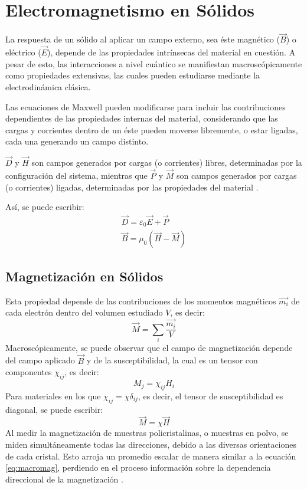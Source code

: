\documentclass[../main.tex]{subfiles}
\begin{document}
\section{Electromagnetismo en Sólidos}
La respuesta de un sólido al aplicar un campo externo, sea éste magnético ($\vec{B}$) o eléctrico ($\vec{E}$), depende de las propiedades intrínsecas del material en cuestión. A pesar de esto, las interacciones a nivel cuántico se manifiestan macroscópicamente como propiedades extensivas, las cuales pueden estudiarse mediante la electrodinámica clásica.

Las ecuaciones de Maxwell pueden modificarse para incluir las contribuciones dependientes de las propiedades internas del material, considerando que las cargas y corrientes dentro de un éste pueden moverse libremente, o estar ligadas, cada una generando un campo distinto.

$\vec{D}$ y $\vec{H}$ son campos generados por cargas (o corrientes) libres, determinadas por la configuración del sistema, mientras que $\vec{P}$ y $\vec{M}$ son campos generados por cargas (o corrientes) ligadas, determinadas por las propiedades del material \cite{griffiths2023introduction}.

Así, se puede escribir:
\begin{equation}
    \begin{split}
        \vec{D}=\varepsilon_0\vec{E}+\vec{P}\\
        \vec{B}=\mu_0(\vec{H}-\vec{M})
    \end{split}  
    \label{eq:maxwellmacro}
\end{equation}

\subsection{Magnetización en Sólidos}
Esta propiedad depende de las contribuciones de los momentos magnéticos $\vec{m_i}$ de cada electrón dentro del volumen estudiado $V$, es decir:
\begin{equation}
    \vec{M}=\sum_i\dfrac{\vec{m_i}}{V}
    \label{eq:micromag}
\end{equation}
Macroscópicamente, se puede observar que el campo de magnetización depende del campo aplicado $\vec{B}$ y de la susceptibilidad, la cual es un tensor con componentes $\chi_{ij}$, es decir:
\begin{equation}
    M_j=\chi_{ij}H_i
    \label{eq:tensormag}
\end{equation}
Para materiales en los que $\chi_{ij}=\chi\delta_{ij}$, es decir, el tensor de susceptibilidad es diagonal, se puede escribir:
\begin{equation}
    \vec{M}=\chi\vec{H}
    \label{eq:macromag}
\end{equation}
Al medir la magnetización de muestras policristalinas, o muestras en polvo, se miden simultáneamente todas las direcciones, debido a las diversas orientaciones de cada cristal. Esto arroja un promedio escalar de manera similar a la ecuación \ref{eq:macromag}, perdiendo en el proceso información sobre la dependencia direccional de la magnetización \cite{Mugiraneza2022}.
\end{document}
